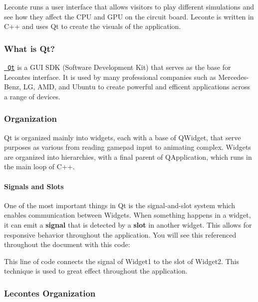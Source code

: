 Leconte runs a user interface that allows visitors to play different simulations and see how they affect the C\+PU and G\+PU on the circuit board. Leconte is written in C++ and uses Qt to create the visuals of the application.

\subsubsection*{What is Qt?}

\href{https://www.qt.io/}{\texttt{ Qt}} is a G\+UI S\+DK (Software Development Kit) that serves as the base for Leconte\textquotesingle{}s interface. It is used by many professional companies such as Mercedes-\/\+Benz, LG, A\+MD, and Ubuntu to create powerful and efficent applications across a range of devices.

\subsubsection*{Organization}

Qt is organized mainly into widgets, each with a base of Q\+Widget, that serve purposes as various from reading gamepad input to animating complex. Widgets are organized into hierarchies, with a final parent of Q\+Application, which runs in the main loop of C++.

\paragraph*{Signals and Slots}

One of the most important things in Qt is the signal-\/and-\/slot system which enables communication between Widgets. When something happens in a widget, it can emit a {\bfseries{signal}} that is detected by a {\bfseries{slot}} in another widget. This allows for responsive behavior throughout the application. You will see this referenced throughout the document with this code\+:


\begin{DoxyCode}{0}
\end{DoxyCode}


This line of code connects the signal of {\ttfamily Widget1} to the slot of {\ttfamily Widget2}. This technique is used to great effect throughout the application.

\subsubsection*{Leconte\textquotesingle{}s Organization}

